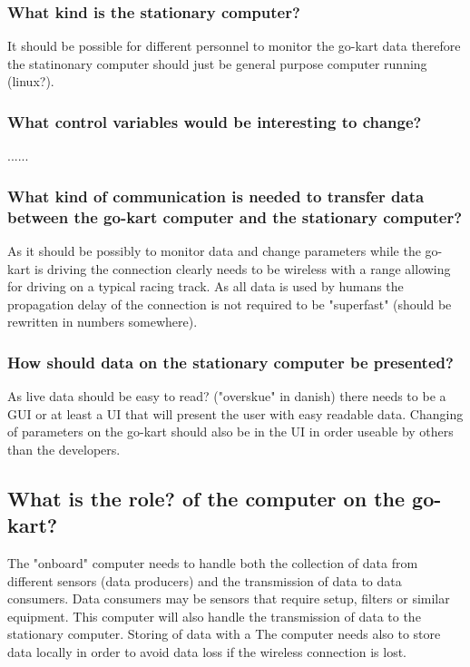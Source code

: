 \subsubsection*{What kind is the stationary computer?}
It should be possible for different personnel to monitor the go-kart data therefore the statinonary computer should just be general purpose computer running (linux?).


\subsubsection*{What control variables would be interesting to change?}
......

\subsubsection*{What kind of communication is needed to transfer data between the go-kart computer and the stationary computer?}
As it should be possibly to monitor data and change parameters while the go-kart is driving the connection clearly needs to be wireless with a range allowing for driving on a typical racing track. 
As all data is used by humans the propagation delay of the connection is not required to be "superfast" (should be rewritten in numbers somewhere).

\subsubsection*{How should data on the stationary computer be presented?}
As live data should be easy to read? ("overskue" in danish) there needs to be a GUI or at least a UI that will present the user with easy readable data. 
Changing of parameters on the go-kart should also be in the UI in order useable by others than the developers.

\subsection{What is the role? of the computer on the go-kart?}
The "onboard" computer needs to handle both the collection
of data from different sensors (data producers) and the transmission of data to 
data consumers.
Data consumers may be sensors that require setup, filters or similar equipment.
This computer will also handle the transmission of data to the stationary 
computer.
Storing of data with a 
The computer needs also to store data locally in order to avoid data loss if the wireless connection is lost.

